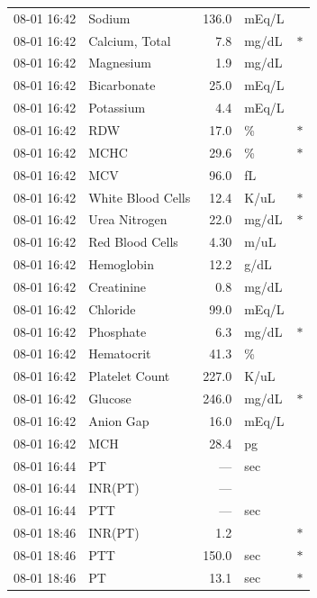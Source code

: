 \documentclass[12pt, a4paper]{article}
\begin{document}
{\begin{longtable}{l p{4.5cm} r l c}
08-01 16:42 & Sodium                         & 136.0  & mEq/L  &     \\
08-01 16:42 & Calcium, Total                 & 7.8    & mg/dL  & $*$ \\
08-01 16:42 & Magnesium                      & 1.9    & mg/dL  &     \\
08-01 16:42 & Bicarbonate                    & 25.0   & mEq/L  &     \\
08-01 16:42 & Potassium                      & 4.4    & mEq/L  &     \\
08-01 16:42 & RDW                            & 17.0   & \%     & $*$ \\
08-01 16:42 & MCHC                           & 29.6   & \%     & $*$ \\
08-01 16:42 & MCV                            & 96.0   & fL     &     \\
08-01 16:42 & White Blood Cells              & 12.4   & K/uL   & $*$ \\
08-01 16:42 & Urea Nitrogen                  & 22.0   & mg/dL  & $*$ \\
08-01 16:42 & Red Blood Cells                & 4.30   & m/uL   &     \\
08-01 16:42 & Hemoglobin                     & 12.2   & g/dL   &     \\
08-01 16:42 & Creatinine                     & 0.8    & mg/dL  &     \\
08-01 16:42 & Chloride                       & 99.0   & mEq/L  &     \\
08-01 16:42 & Phosphate                      & 6.3    & mg/dL  & $*$ \\
08-01 16:42 & Hematocrit                     & 41.3   & \%     &     \\
08-01 16:42 & Platelet Count                 & 227.0  & K/uL   &     \\
08-01 16:42 & Glucose                        & 246.0  & mg/dL  & $*$ \\
08-01 16:42 & Anion Gap                      & 16.0   & mEq/L  &     \\
08-01 16:42 & MCH                            & 28.4   & pg     &     \\
08-01 16:44 & PT                             & ---    & sec    &     \\
08-01 16:44 & INR(PT)                        & ---    &        &     \\
08-01 16:44 & PTT                            & ---    & sec    &     \\
08-01 18:46 & INR(PT)                        & 1.2    &        & $*$ \\
08-01 18:46 & PTT                            & 150.0  & sec    & $*$ \\
08-01 18:46 & PT                             & 13.1   & sec    & $*$ \\
\end{longtable}
}
\end{document}
